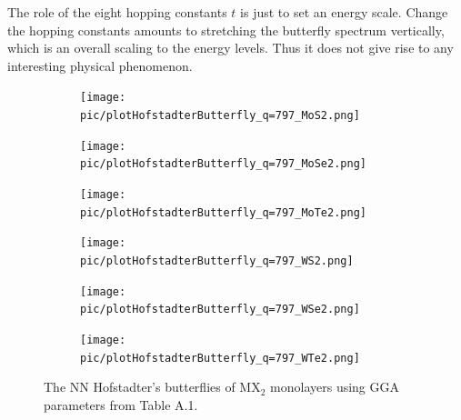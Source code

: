 \documentclass{report}
\begin{document}
The role of the eight hopping constants $t$ is just to set an energy scale. Change the hopping constants amounts to stretching the butterfly spectrum vertically, which is an overall scaling to the energy levels. Thus it does not give rise to any interesting physical phenomenon.
\begin{figure}[htb]
	\centering
	\begin{subfigure}[b]{0.32\linewidth}
		\centering
		\texttt{[image: pic/plotHofstadterButterfly\_q=797\_MoS2.png]}
		\label{fig:matt 1}
	\end{subfigure}
	\begin{subfigure}[b]{0.32\linewidth}
		\centering
		\texttt{[image: pic/plotHofstadterButterfly\_q=797\_MoSe2.png]}
		\label{fig:matt 2}
	\end{subfigure}
	\begin{subfigure}[b]{0.32\linewidth}
		\centering
		\texttt{[image: pic/plotHofstadterButterfly\_q=797\_MoTe2.png]}
		\label{fig:matt 3}
	\end{subfigure}
	\begin{subfigure}[b]{0.32\linewidth}
		\centering
		\texttt{[image: pic/plotHofstadterButterfly\_q=797\_WS2.png]}
		\label{fig:matt 4}
	\end{subfigure}
	\begin{subfigure}[b]{0.32\linewidth}
		\centering
		\texttt{[image: pic/plotHofstadterButterfly\_q=797\_WSe2.png]}
		\label{fig:matt 5}
	\end{subfigure}
	\begin{subfigure}[b]{0.32\linewidth}
		\centering
		\texttt{[image: pic/plotHofstadterButterfly\_q=797\_WTe2.png]}
		\label{fig:matt 6}
	\end{subfigure}
	\caption[Showcase NN Hofstadter’s butterflies of MX$_{2}$ monolayers.]{
		The \ac{NN} Hofstadter’s butterflies of MX$_{2}$ monolayers using GGA parameters from Table A.1.
	}
\end{figure}
\end{document}

